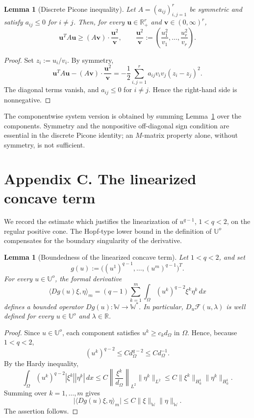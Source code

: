 \documentclass[preprint,10pt]{elsarticle}
\numberwithin{equation}{section}
\newtheorem{lem}[thm]{Lemma}
\begin{document}
\begin{lem}[Discrete Picone inequality]
	\label{lem:picone-discrete}
	Let \(A=(a_{ij})_{i,j=1}^r\) be symmetric and satisfy
	\(a_{ij}\le0\) for \(i\ne j\). Then, for every
	\(\mathbf u\in\mathbb R_+^r\) and
	\(\mathbf v\in(0,\infty)^r\),
	\[
	\mathbf u^T A\mathbf u
	\ge
	(A\mathbf v)\cdot\frac{\mathbf u^2}{\mathbf v},
	\qquad
	\frac{\mathbf u^2}{\mathbf v}
	:=
	\left(
	\frac{u_1^2}{v_1},\ldots,\frac{u_r^2}{v_r}
	\right).
	\]
\end{lem}

\begin{proof}
	Set \(z_i:=u_i/v_i\). By symmetry,
	\[
	\mathbf u^T A\mathbf u
	-
	(A\mathbf v)\cdot\frac{\mathbf u^2}{\mathbf v}
	=
	-\frac12
	\sum_{i,j=1}^r
	a_{ij}v_iv_j(z_i-z_j)^2 .
	\]
	The diagonal terms vanish, and \(a_{ij}\le0\) for \(i\ne j\). Hence the
	right-hand side is nonnegative.
\end{proof}

The componentwise system version is obtained by summing
Lemma~\ref{lem:picone-discrete} over the components. Symmetry and the
nonpositive off-diagonal sign condition are essential in the discrete Picone
identity; an \(M\)-matrix property alone, without symmetry, is not sufficient.

\section{Appendix C. The linearized concave term}
\label{sec:appendix-concave}

We record the estimate which justifies the linearization of
\(u^{q-1}\), \(1<q<2\), on the regular positive cone. The Hopf-type lower
bound in the definition of \(\mathbb U^o\) compensates for the boundary
singularity of the derivative.

\begin{lem}[Boundedness of the linearized concave term]
	\label{lem:concave-differentiability}
	Let \(1<q<2\), and set
	\[
	g(u):=\bigl((u^1)^{q-1},\ldots,(u^m)^{q-1}\bigr)^T .
	\]
	For every \(u\in\mathbb U^o\), the formal derivative
	\[
	\bigl\langle Dg(u)\xi,\eta\bigr\rangle_m
	=
	(q-1)\sum_{k=1}^m
	\int_\Omega
	(u^k)^{q-2}\xi^k\eta^k\,dx
	\]
	defines a bounded operator \(Dg(u):\mathbb W\to\mathbb W^*\). In
	particular, \(D_u\mathcal F(u,\lambda)\) is well defined for every
	\(u\in\mathbb U^o\) and \(\lambda\in\mathbb R\).
\end{lem}

\begin{proof}
	Since \(u\in\mathbb U^o\), each component satisfies
	\(u^k\ge c_kd_\Omega\) in \(\Omega\). Hence, because \(1<q<2\),
	\[
	(u^k)^{q-2}\le C d_\Omega^{q-2}\le C d_\Omega^{-1}.
	\]
	By the Hardy inequality,
	\[
	\int_\Omega
	(u^k)^{q-2}|\xi^k||\eta^k|\,dx
	\le
	C
	\left\|\frac{\xi^k}{d_\Omega}\right\|_{L^2}
	\|\eta^k\|_{L^2}
	\le
	C\|\xi^k\|_{H_0^1}\|\eta^k\|_{H_0^1}.
	\]
	Summing over \(k=1,\ldots,m\) gives
	\[
	\bigl|
	\langle Dg(u)\xi,\eta\rangle_m
	\bigr|
	\le
	C\|\xi\|_{\mathbb W}\|\eta\|_{\mathbb W}.
	\]
	The assertion follows.
\end{proof}
\end{document}
